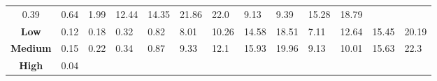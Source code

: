 \begin{table}[H]
{\begin{tabular}{cllll|llll|llll}
            0.39                                               &
            0.64                                               &
            1.99                                               &
            12.44                                              &
            14.35                                              &
            21.86                                              &
            22.0                                               &
            9.13                                               &
            9.39                                               &
            15.28                                              &
            18.79                                                \\
            \textbf{Low}                                       &
            0.12                                               &
            0.18                                               &
            0.32                                               &
            0.82                                               &
            8.01                                               &
            10.26                                              &
            14.58                                              &
            18.51                                              &
            7.11                                               &
            12.64                                              &
            15.45                                              &
            20.19                                                \\
            \textbf{Medium}                                    &
            0.15                                               &
            0.22                                               &
            0.34                                               &
            0.87                                               &
            9.33                                               &
            12.1                                               &
            15.93                                              &
            19.96                                              &
            9.13                                               &
            10.01                                              &
            15.63                                              &
            22.3                                                 \\
            \textbf{High}                                      &
            0.04                                               &

\end{tabular}}
\end{table}
